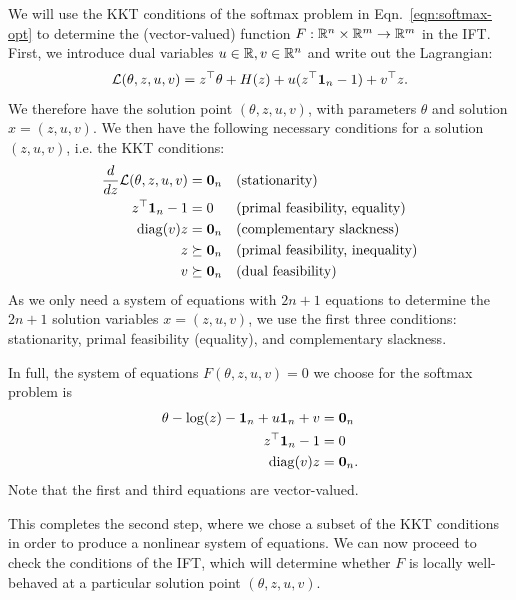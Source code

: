 \documentclass[11pt]{article}
\begin{document}
We will use the KKT conditions of the softmax problem in
Eqn.~\ref{eqn:softmax-opt} to determine the (vector-valued) function $F:\mathbb{R}^n\times\mathbb{R}^m\to\mathbb{R}^m$
in the IFT.
First, we introduce dual variables $u\in\mathbb{R},v\in\mathbb{R}^n$ and write out the Lagrangian:
$$\mathcal{L}(\theta, z, u, v) = z^\top\theta + H(z) + u(z^\top \mathbf{1}_n - 1) + v^\top z.$$
We therefore have the solution point $(\theta,z,u,v)$, with parameters $\theta$
and solution $x=(z,u,v)$.
We then have the following necessary conditions for a solution $(z,u,v)$,
i.e. the KKT conditions:
\begin{equation}
\begin{aligned}
\frac{d}{dz} \mathcal{L}(\theta, z,u,v) &= \mathbf{0}_n && \textrm{(stationarity)}\\
z^{\top} \mathbf{1}_n - 1 &= 0 && \textrm{(primal feasibility, equality)}\\
\mathrm{diag}(v)z &= \mathbf{0}_{n} && \textrm{(complementary slackness)}\\
z &\succeq \mathbf{0}_n && \textrm{(primal feasibility, inequality)}\\
v &\succeq \mathbf{0}_n && \textrm{(dual feasibility)}
\end{aligned}
\end{equation}
As we only need a system of equations with $2n+1$ equations to
determine the $2n+1$ solution variables $x=(z,u,v)$,
we use the first three conditions: stationarity, primal feasibility (equality),
and complementary slackness.

In full, the system of equations $F(\theta, z,u,v) = 0$ we choose
for the softmax problem is
\begin{equation}
\label{eqn:system}
\begin{aligned}
\theta - \log(z) - \mathbf{1}_n + u\mathbf{1}_n + v &= \mathbf{0}_n\\
z^{\top} \mathbf{1}_n - 1 &= 0\\
\mathrm{diag}(v)z &= \mathbf{0}_n.
\end{aligned}
\end{equation}
Note that the first and third equations are vector-valued.

This completes the second step, where we chose a subset of the KKT conditions
in order to produce a nonlinear system of equations.
We can now proceed to check the conditions of the IFT,
which will determine whether $F$ is locally well-behaved
at a particular solution point $(\theta, z,u,v)$.
\end{document}
